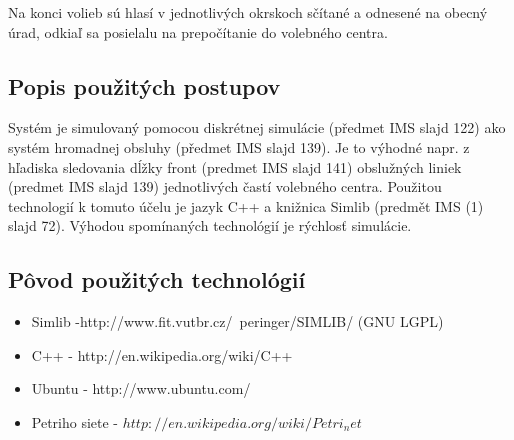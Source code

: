 \documentclass[12pt,a4paper,titlepage,final]{article}
\begin{document}
Na konci volieb sú hlasí v jednotlivých okrskoch sčítané a odnesené na obecný úrad, odkiaľ sa posielalu na prepočítanie do volebného centra.

  


\subsection{Popis použitých postupov}
Systém je simulovaný pomocou diskrétnej simulácie (předmet IMS slajd 122) ako systém hromadnej obsluhy 
(předmet IMS slajd 139). Je to výhodné napr. z hľadiska sledovania dĺžky front (predmet IMS slajd 141) 
obslužných liniek (predmet IMS slajd 139) jednotlivých častí volebného centra. Použitou 
technologií k tomuto účelu je jazyk C++ a knižnica Simlib (predmět IMS (1) slajd 72). Výhodou spomínaných 
technológií je  rýchlosť simulácie.



\subsection{Pôvod použitých technológií}
\begin{itemize}
\item Simlib -http://www.fit.vutbr.cz/~peringer/SIMLIB/ (GNU LGPL)
\item C++ - http://en.wikipedia.org/wiki/C++
\item Ubuntu - http://www.ubuntu.com/
\item Petriho siete - $http://en.wikipedia.org/wiki/Petri_net$

\end{itemize}
\end{document}
